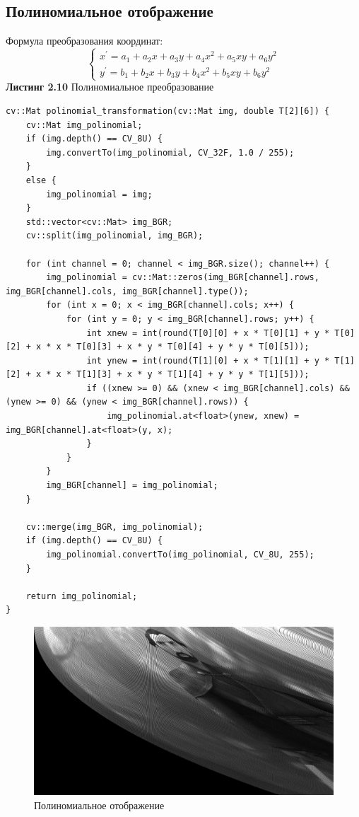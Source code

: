 \subsection{Полиномиальное отображение}
Формула преобразования координат:
\begin{equation}
    \begin{cases}
        x^\prime = a_1 + a_2 x + a_3 y + a_4 x^2 + a_5 xy + a_6 y^2\\
        y^\prime = b_1 + b_2 x + b_3 y + b_4 x^2 + b_5 xy + b_6 y^2
    \end{cases}
\end{equation}
\noindent \textbf{Листинг 2.10} Полиномиальное преобразование
\begin{lstlisting}
cv::Mat polinomial_transformation(cv::Mat img, double T[2][6]) {
    cv::Mat img_polinomial;
    if (img.depth() == CV_8U) {
        img.convertTo(img_polinomial, CV_32F, 1.0 / 255);
    }
    else {
        img_polinomial = img;
    }
    std::vector<cv::Mat> img_BGR;
    cv::split(img_polinomial, img_BGR);

    for (int channel = 0; channel < img_BGR.size(); channel++) {
        img_polinomial = cv::Mat::zeros(img_BGR[channel].rows, img_BGR[channel].cols, img_BGR[channel].type());
        for (int x = 0; x < img_BGR[channel].cols; x++) {
            for (int y = 0; y < img_BGR[channel].rows; y++) {
                int xnew = int(round(T[0][0] + x * T[0][1] + y * T[0][2] + x * x * T[0][3] + x * y * T[0][4] + y * y * T[0][5]));
                int ynew = int(round(T[1][0] + x * T[1][1] + y * T[1][2] + x * x * T[1][3] + x * y * T[1][4] + y * y * T[1][5]));
                if ((xnew >= 0) && (xnew < img_BGR[channel].cols) && (ynew >= 0) && (ynew < img_BGR[channel].rows)) {
                    img_polinomial.at<float>(ynew, xnew) = img_BGR[channel].at<float>(y, x);
                }
            }
        }
        img_BGR[channel] = img_polinomial;
    }

    cv::merge(img_BGR, img_polinomial);
    if (img.depth() == CV_8U) {
        img_polinomial.convertTo(img_polinomial, CV_8U, 255);
    }

    return img_polinomial;
}
\end{lstlisting}
\begin{figure}[h]
    \centering
    \includegraphics[scale=0.3]{"../images/results/polinomial_transformed_image.jpg"}
    \caption{Полиномиальное отображение}
\end{figure}
\newpage


